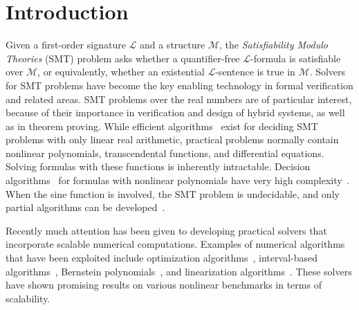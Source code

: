 \documentclass[prodmode]{acmsmall} %
\begin{document}

\section{Introduction}

Given a first-order signature $\mathcal{L}$ and a structure $\mathcal{M}$, the {\em Satisfiability Modulo Theories} (SMT) problem asks whether a quantifier-free $\mathcal{L}$-formula is satisfiable over $\mathcal{M}$, or equivalently, whether an existential $\mathcal{L}$-sentence is true in $\mathcal{M}$. Solvers for SMT problems have become the key enabling technology in formal verification and related areas. SMT problems over the real numbers are of particular interest, because of their importance in verification and design of hybrid systems, as well as in theorem proving. While efficient algorithms~\cite{linear06} exist for deciding SMT problems with only linear real arithmetic, practical problems normally contain nonlinear polynomials, transcendental functions, and differential equations. Solving formulas with these functions is inherently intractable. Decision algorithms~\cite{collins} for formulas with nonlinear polynomials have very high complexity~\cite{BrownD07}. When the sine function is involved, the SMT problem is undecidable, and only partial algorithms can be developed~\cite{DBLP:journals/lmcs/AvigadF06,DBLP:journals/jar/AkbarpourP10}.

Recently much attention has been given to developing practical solvers that incorporate scalable numerical computations. Examples of numerical algorithms that have been exploited include optimization algorithms~\cite{BorrallerasLNRR09,DBLP:conf/fmcad/NuzzoPSS10}, interval-based algorithms~\cite{HySAT,DBLP:conf/atva/EggersFH08,DBLP:conf/sefm/EggersRNF11,DBLP:conf/fmcad/Gao10}, Bernstein polynomials~\cite{bern}, and linearization algorithms~\cite{cordic}. These solvers have shown promising results on various nonlinear benchmarks in terms of scalability. 
\end{document}
